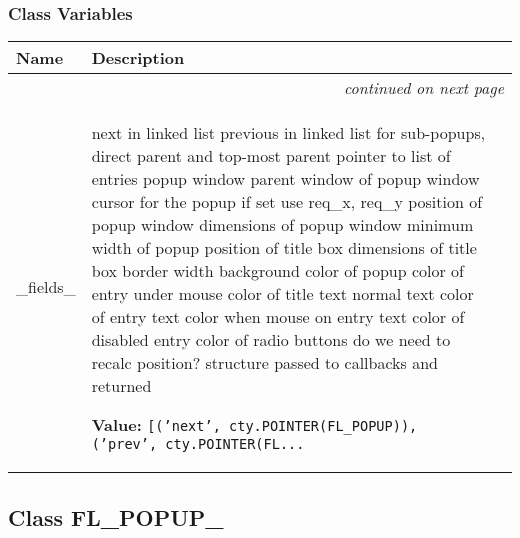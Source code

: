 
  \subsubsection{Class Variables}

    \vspace{-1cm}
\hspace{\varindent}\begin{longtable}{|p{\varnamewidth}|p{\vardescrwidth}|l}
\cline{1-2}
\cline{1-2} \centering \textbf{Name} & \centering \textbf{Description}& \\
\cline{1-2}
\endhead\cline{1-2}\multicolumn{3}{r}{\small\textit{continued on next page}}\\\endfoot\cline{1-2}
\endlastfoot\raggedright \_\-f\-i\-e\-l\-d\-s\-\_\- & \raggedright next in linked list
previous in linked list
for sub-popups, direct parent
and top-most parent
pointer to list of entries
popup window
parent window of popup window
cursor for the popup
if set use req\_x, req\_y
position of popup window
dimensions of popup window
minimum width of popup
position of title box
dimensions of title box
border width
background color of popup
color of entry under mouse
color of title text
normal text color of entry
text color when mouse on entry
text color of disabled entry
color of radio buttons
do we need to recalc position?
structure passed to callbacks and returned

\textbf{Value:} 
{\tt [('next', cty.POINTER(FL\_POPUP)), ('prev', cty.POINTER(FL\texttt{...}}&\\
\cline{1-2}
\end{longtable}



\subsection{Class FL\_POPUP\_}

